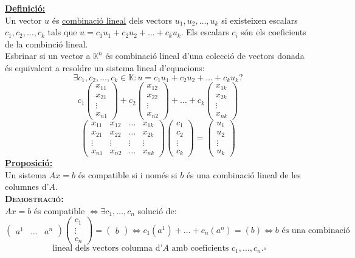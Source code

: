 \documentclass[11pt]{article}
\newcommand{\fieldk}{\mathbb{K}}
\newcommand{\definicio}{\underline{\textbf{Definició:}}\\}
\newcommand{\proposicio}{\underline{\textbf{Proposició:}}\\}
\newcommand{\demostracio}{\textbf{{\scshape Demostració:}}\\}
\begin{document}
\definicio Un vector $u$ és \underline{combinació lineal} dels vectors $u_1,u_2,\ldots,u_k$ si existeixen escalars $c_1,c_2,\ldots,c_k$ tals que $u=c_1u_1+c_2u_2+\ldots+c_ku_k$. Els escalars $c_i$ són els coeficients de la combinció lineal.\\
Esbrinar si un vector a $\fieldk^n$ és combinació lineal d'una colecció de vectors donada és equivalent a resoldre un sistema lineal d'equacions:
$$\exists c_1,c_2,\ldots,c_k\in\fieldk : u=c_1u_1+c_2u_2+\ldots+c_ku_k?$$
$$
c_1\left( \begin{array}{c}
x_{11} \\
x_{21} \\
\vdots \\
x_{n1} \end{array} \right)
+ c_2\left( \begin{array}{c}
x_{12} \\
x_{22} \\
\vdots \\
x_{n2} \end{array} \right)
+\ldots
+c_k \left( \begin{array}{c}
x_{1k} \\
x_{2k} \\
\vdots \\
x_{nk} \end{array} \right)
$$
$$
\left( \begin{array}{cccc}
x_{11} & x_{12} & \ldots & x_{1k} \\
x_{21} & x_{22} & \ldots & x_{2k} \\
\vdots & \vdots & \vdots & \vdots\\
x_{n1} & x_{n2} & \ldots & x_{nk} \end{array} \right)
\left( \begin{array}{c}
c_1 \\
c_2 \\
\vdots \\
c_k \end{array} \right)
=
\left( \begin{array}{c}
u_1 \\
u_2 \\
\vdots \\
u_k \end{array} \right)
$$
\proposicio Un sistema $Ax=b$ és compatible si i només si $b$ és una combinació lineal de les columnes d'$A$.\\
\demostracio $Ax=b$ és compatible $\iff\exists c_1,\ldots,c_n$ solució de:
$$
\left( \begin{array}{ccc}
a^1 & \ldots & a^n \end{array} \right)
\left( \begin{array}{c}
c_1 \\
\vdots \\
c_n \end{array} \right)
=
\left( \begin{array}{c}
b \end{array} \right)
\iff c_1(a^1)+\ldots+c_n(a^n)=(b)
\iff b \textrm{ és una combinació}
$$
$$\textrm{ lineal dels vectors columna d'}A\textrm{ amb coeficients }c_1,\ldots,c_n.\square$$
\end{document}

